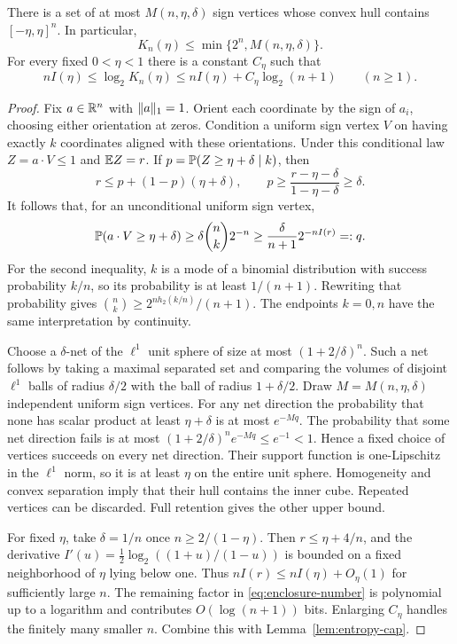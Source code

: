 \begin{lemma}\label{lem:enclosure}
There is a set of at most $M(n,\eta,\delta)$ sign vertices whose
convex hull contains $[-\eta,\eta]^n$. In particular,
\begin{equation}\label{eq:checkpoint-bound}
 K_n(\eta)\le\min\{2^n,M(n,\eta,\delta)\}.
\end{equation}
For every fixed $0<\eta<1$ there is a constant $C_\eta$ such that
\begin{equation}\label{eq:checkpoint-rate}
 nI(\eta)\le\log_2 K_n(\eta)
           \le nI(\eta)+C_\eta\log_2(n+1)\qquad(n\ge1).
\end{equation}
\end{lemma}
\begin{proof}
Fix $a\in\mathbb R^n$ with $\lVert a\rVert_1=1$. Orient each coordinate by the
sign of $a_i$, choosing either orientation at zeros. Condition a uniform
sign vertex $V$ on having exactly $k$ coordinates aligned with these
orientations. Under this conditional law $Z=a\cdot V\le1$ and
$\mathbb E Z=r$. If $p=\mathbb P(Z\ge\eta+\delta\mid k)$, then
\[
 r\le p+(1-p)(\eta+\delta),\qquad
 p\ge\frac{r-\eta-\delta}{1-\eta-\delta}\ge\delta.
\]
It follows that, for an unconditional uniform sign vertex,
\begin{equation}\label{eq:layer-probability}
 \mathbb P(a\cdot V\ge\eta+\delta)
             \ge\delta\binom nk2^{-n}
             \ge\frac{\delta}{n+1}2^{-nI(r)}=:q.
\end{equation}
For the second inequality, $k$ is a mode of a binomial distribution
with success probability $k/n$, so its probability is at least
$1/(n+1)$. Rewriting that probability gives
$\binom nk\ge2^{nh_2(k/n)}/(n+1)$. The endpoints $k=0,n$ have
the same interpretation by continuity.

Choose a $\delta$-net of the $\ell^1$ unit sphere of size at most
$(1+2/\delta)^n$. Such a net follows by taking a maximal separated
set and comparing the volumes of disjoint $\ell^1$ balls of radius
$\delta/2$ with the ball of radius $1+\delta/2$.
Draw $M=M(n,\eta,\delta)$ independent uniform sign vertices. For
any net direction the probability that none has scalar product at
least $\eta+\delta$ is at most $e^{-Mq}$. The probability that
some net direction fails is at most
$(1+2/\delta)^n e^{-Mq}\le e^{-1}<1$.
Hence a fixed choice of vertices succeeds on every net direction.
Their support function is one-Lipschitz in the $\ell^1$ norm, so it
is at least $\eta$ on the entire unit sphere. Homogeneity and convex
separation imply that their hull contains the inner cube. Repeated
vertices can be discarded. Full retention gives the other upper bound.

For fixed $\eta$, take $\delta=1/n$ once $n\ge2/(1-\eta)$.
Then $r\le\eta+4/n$, and the derivative
$I'(u)=\frac12\log_2((1+u)/(1-u))$ is bounded on a fixed
neighborhood of $\eta$ lying below one. Thus
$nI(r)\le nI(\eta)+O_\eta(1)$ for sufficiently large $n$.
The remaining factor in \eqref{eq:enclosure-number} is polynomial
up to a logarithm and contributes $O(\log(n+1))$ bits.
Enlarging $C_\eta$ handles the finitely many smaller $n$.
Combine this with Lemma~\ref{lem:entropy-cap}.
\end{proof}
